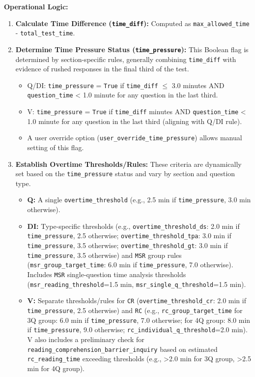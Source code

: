 \documentclass{article}
\begin{document}
\textbf{Operational Logic:}
\begin{enumerate}
    \item \textbf{Calculate Time Difference (\texttt{time\_diff}):} Computed as \texttt{max\_allowed\_time} - \texttt{total\_test\_time}.
    \item \textbf{Determine Time Pressure Status (\texttt{time\_pressure}):} This Boolean flag is determined by section-specific rules, generally combining \texttt{time\_diff} with evidence of rushed responses in the final third of the test.
    \begin{itemize}
        \item Q/DI: \texttt{time\_pressure} = \texttt{True} if \texttt{time\_diff} $\leq$ 3.0 minutes AND \texttt{question\_time} < 1.0 minute for any question in the last third.
        \item V: \texttt{time\_pressure} = \texttt{True} if \texttt{time\_diff}  minutes AND \texttt{question\_time} < 1.0 minute for any question in the last third (aligning with Q/DI rule).
        \item A user override option (\texttt{user\_override\_time\_pressure}) allows manual setting of this flag.
    \end{itemize}
    \item \textbf{Establish Overtime Thresholds/Rules:} These criteria are dynamically set based on the \texttt{time\_pressure} status and vary by section and question type.
    \begin{itemize}
        \item \textbf{Q:} A single \texttt{overtime\_threshold} (e.g., 2.5 min if \texttt{time\_pressure}, 3.0 min otherwise).
        \item \textbf{DI:} Type-specific thresholds (e.g., \texttt{overtime\_threshold\_ds}: 2.0 min if \texttt{time\_pressure}, 2.5 otherwise; \texttt{overtime\_threshold\_tpa}: 3.0 min if \texttt{time\_pressure}, 3.5 otherwise; \texttt{overtime\_threshold\_gt}: 3.0 min if \texttt{time\_pressure}, 3.5 otherwise) and \texttt{MSR} group rules (\texttt{msr\_group\_target\_time}: 6.0 min if \texttt{time\_pressure}, 7.0 otherwise). Includes \texttt{MSR} single-question time analysis thresholds (\texttt{msr\_reading\_threshold}=1.5 min, \texttt{msr\_single\_q\_threshold}=1.5 min).
        \item \textbf{V:} Separate thresholds/rules for \texttt{CR} (\texttt{overtime\_threshold\_cr}: 2.0 min if \texttt{time\_pressure}, 2.5 otherwise) and \texttt{RC} (e.g., \texttt{rc\_group\_target\_time} for 3Q group: 6.0 min if \texttt{time\_pressure}, 7.0 otherwise; for 4Q group: 8.0 min if \texttt{time\_pressure}, 9.0 otherwise; \texttt{rc\_individual\_q\_threshold}=2.0 min). V also includes a preliminary check for \texttt{reading\_comprehension\_barrier\_inquiry} based on estimated \texttt{rc\_reading\_time} exceeding thresholds (e.g., >2.0 min for 3Q group, >2.5 min for 4Q group).

\end{itemize}
\end{enumerate}
\end{document}
